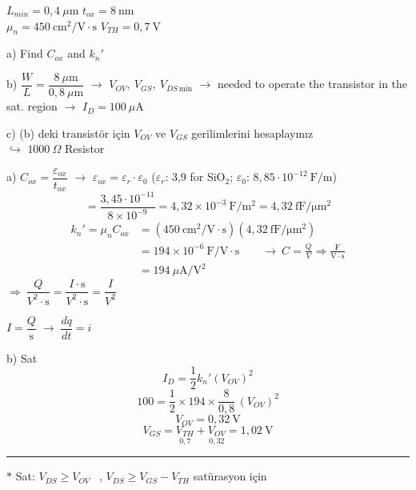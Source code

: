 \documentclass[11pt,a4paper]{article}
\begin{document}
\begin{ornek}[5.1]
  $L_{min} = 0{,}4\ \mu\mathrm{m}$ \hfill $t_{ox} = 8\ \mathrm{nm}$ \hspace{2cm} \\
  $\mu_n = 450\ \mathrm{cm^2/V\cdot s}$ \hfill $V_{TH} = 0{,}7\ \mathrm{V}$ \hspace{2cm}

  a) Find $C_{ox}$ and $k_n'$

  b) $\dfrac{W}{L} = \dfrac{8\ \mu\mathrm{m}}{0{,}8\ \mu\mathrm{m}}$ $\rightarrow$ $V_{OV},\ V_{GS},\ V_{DS\,\mathrm{min}}$ $\rightarrow$ needed to operate the transistor in the sat. region $\rightarrow$ $I_D = 100\ \mu\mathrm{A}$

  c) (b) deki transistör için $V_{OV}$ ve $V_{GS}$ gerilimlerini hesaplayınız \\
  $\hookrightarrow$ $1000\ \Omega$ Resistor
\end{ornek}
\begin{cozum}
  a) $C_{ox} = \dfrac{\varepsilon_{ox}}{t_{ox}}$ \quad $\rightarrow$ \quad $\varepsilon_{ox} = \varepsilon_r \cdot \varepsilon_0$
  \quad ($\varepsilon_r$: 3,9 for SiO$_2$; $\varepsilon_0$: $8{,}85\cdot10^{-12}\ \mathrm{F/m}$)
  \[ = \frac{3{,}45\cdot10^{-11}}{8\times10^{-9}} = 4{,}32\times10^{-3}\ \mathrm{F/m^2} = 4{,}32\ \mathrm{fF/\mu m^2} \]
  \begin{align*}
    k_n' = \mu_n C_{ox} &= (450\ \mathrm{cm^2/V\cdot s})(4{,}32\ \mathrm{fF/\mu m^2}) \\
    &= 194\times10^{-6}\ \mathrm{F/V\cdot s} \qquad \rightarrow\ C = \frac{Q}{V} \Rightarrow \frac{\mathrm{F}}{\mathrm{V\cdot s}} \\
    &= 194\ \mu\mathrm{A/V^2}
  \end{align*}
  \hfill $\Rightarrow\ \dfrac{Q}{V^2\cdot\mathrm{s}} = \dfrac{I\cdot\mathrm{s}}{V^2\cdot\mathrm{s}} = \dfrac{I}{V^2}$

  \hfill $I = \dfrac{Q}{\mathrm{s}} \;\rightarrow\; \dfrac{dq}{dt} = i$

  b) Sat
  \[ I_D = \frac{1}{2}k_n'(V_{OV})^2 \]
  \[ 100 = \frac{1}{2}\times194\times\frac{8}{0{,}8}\,(V_{OV})^2 \]
  \[ V_{OV} = 0{,}32\ \mathrm{V} \]
  \[ V_{GS} = \underset{0{,}7}{V_{TH}} + \underset{0{,}32}{V_{OV}} = 1{,}02\ \mathrm{V} \]
\end{cozum}

\noindent\rule{\linewidth}{0.4pt}

\noindent\textcolor{kirmizikalem}{$\ast$} Sat: \quad $V_{DS} \ge V_{OV}$ \ , \qquad $V_{DS} \ge V_{GS} - V_{TH}$ \qquad satürasyon için
\end{document}

